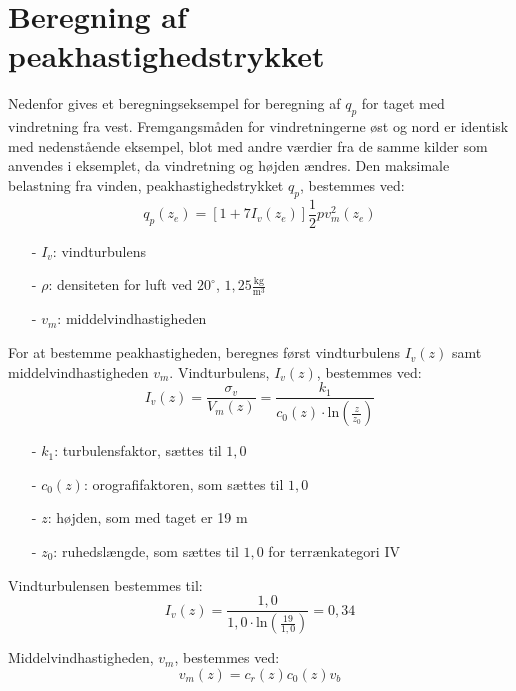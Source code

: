 \chapter{Beregning af peakhastighedstrykket}
Nedenfor gives et beregningseksempel for beregning af $q_p$ for taget med vindretning fra vest. Fremgangsmåden for vindretningerne øst og nord er identisk med nedenstående eksempel, blot med andre værdier fra de samme kilder som anvendes i eksemplet, da vindretning og højden ændres.
\newline
\newline
Den maksimale belastning fra vinden, peakhastighedstrykket $q_p$, bestemmes ved:
\begin{equation}
	q_p(z_e)=[1+7I_v(z_e)]\frac{1}{2}pv_m^2(z_e)
\end{equation}
\begin{itemize}
	\item[-] $I_v$: vindturbulens
	\item[-] $\rho$: densiteten for luft ved $20^{\circ}$, $1,\!25 \frac{\text{kg}}{\text{m}^3}$
	\item[-] $v_m$: middelvindhastigheden
\end{itemize}
For at bestemme peakhastigheden, beregnes først vindturbulens $I_v(z)$ samt middelvindhastigheden $v_m$.
\newline
\newline
Vindturbulens, $I_v(z)$, bestemmes ved:
\begin{equation}
	I_v(z)=\frac{\sigma_v}{V_m(z)}=\frac{k_1}{c_0(z)\cdot \text{ln}(\frac{z}{z_0})}
\end{equation}
\begin{itemize}
	\item[-] $k_1$: turbulensfaktor, sættes til $1,\!0$ \citep[ kapitel 4.4]{EU91}
	\item[-] $c_0(z)$: orografifaktoren, som sættes til $1,\!0$ \citep[ kapitel 4.3.1]{EU91}
	\item[-] $z$: højden, som med taget er 19 m
	\item[-] $z_0$: ruhedslængde, som sættes til $1,\!0$ for terrænkategori IV \citep[ tabel 4.1 kapitel 4.3.2]{EU91}
\end{itemize}
Vindturbulensen bestemmes til:
\begin{equation}
	I_v(z)=\frac{1,\!0}{1,\!0\cdot \text{ln}(\frac{19}{1,0})}=0,\!34
\end{equation}

Middelvindhastigheden, $v_m$, bestemmes ved:
\begin{equation}
	v_m(z)=c_r(z)c_0(z)v_b
\end{equation}

